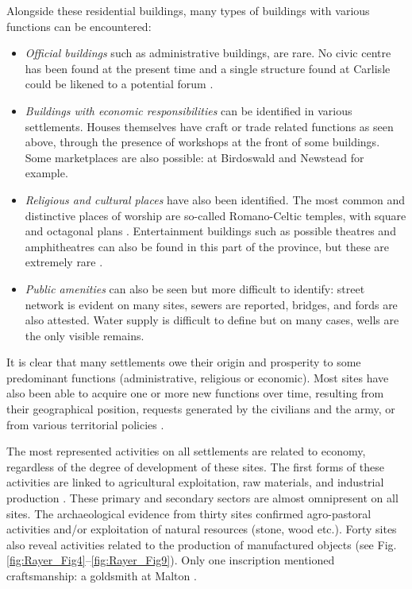 Alongside these residential buildings, many types of buildings with various functions can be encountered:

\begin{itemize}
\item \emph{Official buildings} such as administrative buildings, are rare. No civic centre has been found at the present time and a single structure found at Carlisle could be likened to a potential forum \parencite[76]{McCarthy_2002}. 

\item \emph{Buildings with economic responsibilities} can be identified in various settlements. Houses themselves have craft or trade related functions as seen above, through the presence of workshops at the front of some buildings. Some marketplaces are also possible: at Birdoswald \parencite[176]{Biggins_2004b} and Newstead \parencite[84]{Hunter_2012} for example.

\item \emph{Religious and cultural places} have also been identified. The most common and distinctive places of worship are so-called Romano-Celtic temples, with square and octagonal plans \parencite[53]{Burnham_1988b}. Entertainment buildings such as possible theatres and amphitheatres can also be found in this part of the province, but these are extremely rare \parencite[see for instance][]{Neighbour_2007}. 

\item \emph{Public amenities} can also be seen but more difficult to identify: street network is evident on many sites, sewers are reported, bridges, and fords are also attested. Water supply is difficult to define but on many cases, wells are the only visible remains.
\end{itemize}
It is clear that many settlements owe their origin and prosperity to some predominant functions (administrative, religious or economic). Most sites have also been able to acquire one or more new functions over time, resulting from their geographical position, requests generated by the civilians and the army, or from various territorial policies \parencite[289--290]{Mattingly_2006}.

The most represented activities on all settlements are related to economy, regardless of the degree of development of these sites. The first forms of these activities are linked to agricultural exploitation, raw materials, and industrial production \parencite[34--35]{Sommer_1984}. These primary and secondary sectors are almost omnipresent on all sites. The archaeological evidence from thirty sites confirmed agro-pastoral activities and/or exploitation of natural resources (stone, wood etc.). Forty sites also reveal activities related to the production of manufactured objects (see Fig. \ref{fig:Rayer_Fig4}--\ref{fig:Rayer_Fig9}). 
Only one inscription mentioned craftsmanship: a goldsmith at Malton \parencite[712]{RIB_1965}.

